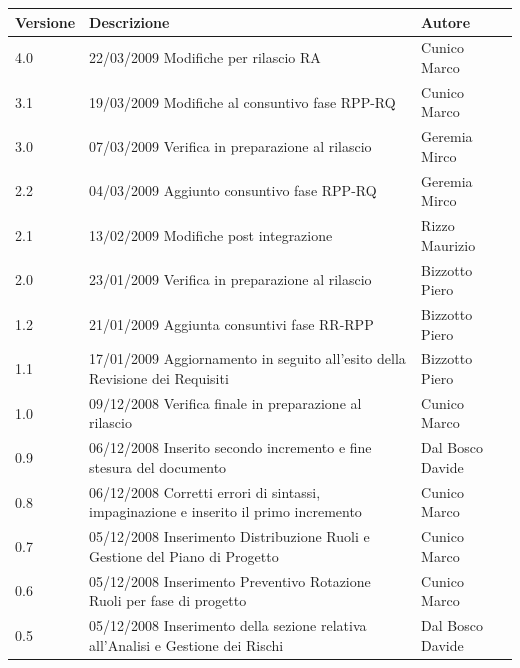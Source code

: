 \begin{center}
	\begin{table}[h]
		  \begin{tabular*}
			{1\textwidth}%
				{@{\extracolsep{\fill}}|p{}|p{}|p{}|}
			 \hline
			\textbf{Versione}  & \textbf{Descrizione} & \textbf{Autore} \\
		 \hline
			4.0 & 22/03/2009 Modifiche per rilascio RA & Cunico Marco \\
			\hline
			3.1 & 19/03/2009 Modifiche al consuntivo fase RPP-RQ & Cunico Marco \\
			\hline
			3.0 & 07/03/2009 Verifica in preparazione al rilascio & Geremia Mirco\\
			\hline
			2.2 & 04/03/2009 Aggiunto consuntivo fase RPP-RQ & Geremia Mirco\\
            \hline
            2.1 & 13$\slash$02$\slash$2009    Modifiche post integrazione  & Rizzo Maurizio \\
            \hline
			2.0 & 23/01/2009	Verifica in preparazione al rilascio & Bizzotto Piero \\
			\hline
			1.2 & 21/01/2009	Aggiunta consuntivi fase RR-RPP & Bizzotto Piero \\
			\hline
			1.1 & 17/01/2009	Aggiornamento in seguito all'esito della Revisione dei Requisiti & Bizzotto Piero \\
			\hline
			1.0 & 	 09$\slash$12$\slash$2008 Verifica finale in preparazione al rilascio & Cunico Marco \\
			\hline
          0.9 & 06/12/2008 Inserito secondo incremento e fine stesura del documento & Dal Bosco Davide\\
          \hline
          0.8 & 06/12/2008 Corretti errori di sintassi, impaginazione e inserito il primo incremento & Cunico Marco \\
		 \hline
          0.7 & 05/12/2008 Inserimento Distribuzione Ruoli e Gestione del Piano di Progetto & Cunico Marco \\
          \hline
          0.6 & 05/12/2008 Inserimento Preventivo Rotazione Ruoli per fase di progetto & Cunico Marco \\
          \hline
          0.5 & 05/12/2008 Inserimento della sezione relativa all'Analisi e Gestione dei Rischi & Dal Bosco Davide \\

\end{tabular*}
\end{table}
\end{center}
